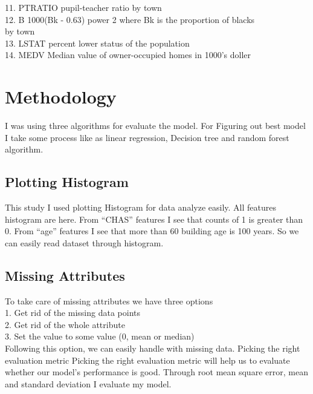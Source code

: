 \documentclass[conference]{IEEEtran}
\begin{document}
11. PTRATIO  pupil-teacher ratio by town\\
12. B        1000(Bk - 0.63) power 2 where Bk is the proportion of blacks\\ by town\\
13. LSTAT    percent lower status of the population\\
14. MEDV     Median value of owner-occupied homes in 1000's doller\\


\section{Methodology}
I was using three algorithms for evaluate the model. For Figuring out best model I take some process like as linear regression, Decision tree and random forest algorithm.
\subsection{Plotting Histogram}\label{AA} This study I used plotting Histogram for data analyze easily. All features histogram are here. From “CHAS” features I see that counts of 1 is greater than 0. From “age” features I see that more than 60 building age is 100 years. So we can easily read dataset through histogram.


\subsection{Missing Attributes}\label{AA}
To take care of missing attributes we have three options\\ 
1. Get rid of the missing data points \\
2. Get rid of the whole attribute \\
3. Set the value to some value (0, mean or median) \\
Following this option, we can easily handle with missing data. Picking the right evaluation metric Picking the right evaluation metric will help us to evaluate whether our model’s performance is good. Through root mean square error, mean and standard deviation I evaluate my model.
\end{document}
